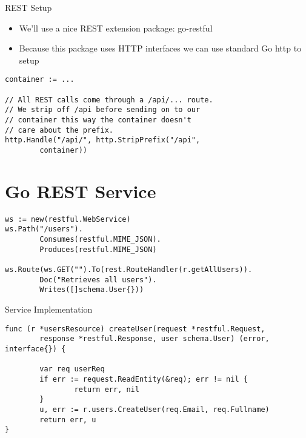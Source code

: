 \documentclass[presentation]{beamer}
\begin{document}
\begin{frame}[fragile,label=sec-6-2]{REST Setup}
 \begin{itemize}
\item We'll use a nice REST extension package: go-restful
\item Because this package uses HTTP interfaces we can use standard Go http to setup
\end{itemize}
\begin{verbatim}
container := ...

// All REST calls come through a /api/... route.
// We strip off /api before sending on to our
// container this way the container doesn't
// care about the prefix.
http.Handle("/api/", http.StripPrefix("/api",
        container))
\end{verbatim}
\end{frame}

\section{Go REST Service}
\label{sec-7}
\begin{verbatim}
ws := new(restful.WebService)
ws.Path("/users").
        Consumes(restful.MIME_JSON).
        Produces(restful.MIME_JSON)

ws.Route(ws.GET("").To(rest.RouteHandler(r.getAllUsers)).
        Doc("Retrieves all users").
        Writes([]schema.User{}))
\end{verbatim}

\begin{frame}[fragile,label=sec-7-1]{Service Implementation}
 \begin{verbatim}
func (r *usersResource) createUser(request *restful.Request,
        response *restful.Response, user schema.User) (error, interface{}) {

        var req userReq
        if err := request.ReadEntity(&req); err != nil {
                return err, nil
        }
        u, err := r.users.CreateUser(req.Email, req.Fullname)
        return err, u
}
\end{verbatim}
\end{frame}
\end{document}
